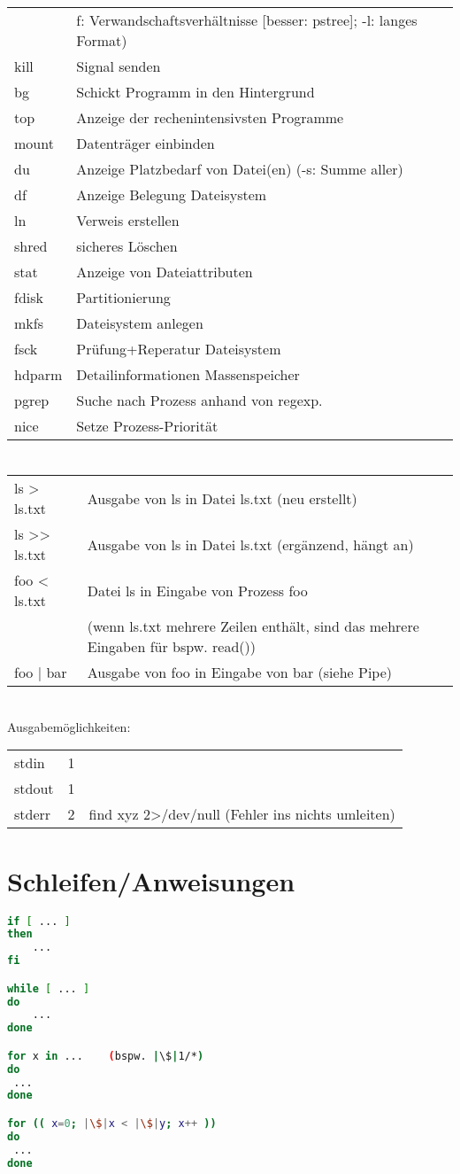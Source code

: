 \begin{longtable}[l]{ l | l }
& f: Verwandschaftsverhältnisse [besser: pstree]; -l: langes Format)\\
kill & Signal senden\\
bg & Schickt Programm in den Hintergrund\\
top & Anzeige der rechenintensivsten Programme\\
mount & Datenträger einbinden\\
du & Anzeige Platzbedarf von Datei(en) (-s: Summe aller)\\
df & Anzeige Belegung Dateisystem\\
ln & Verweis erstellen\\
shred & sicheres Löschen\\
stat & Anzeige von Dateiattributen\\
fdisk & Partitionierung\\
mkfs & Dateisystem anlegen\\
fsck & Prüfung+Reperatur Dateisystem\\
hdparm & Detailinformationen Massenspeicher\\
pgrep & Suche nach Prozess anhand von regexp.\\
nice & Setze Prozess-Priorität
\end{longtable}

\section[Weiterleitung]{}
\begin{tabular}{l l}
ls > ls.txt & Ausgabe von ls in Datei ls.txt (neu erstellt)\\
ls >> ls.txt & Ausgabe von ls in Datei ls.txt (ergänzend, hängt an)\\
foo < ls.txt & Datei ls in Eingabe von Prozess foo\\
& (wenn ls.txt mehrere Zeilen enthält, sind das mehrere Eingaben für bspw. read())\\
foo | bar & Ausgabe von foo in Eingabe von bar (siehe Pipe)
\end{tabular}\\
Ausgabemöglichkeiten:\\
\begin{tabular}{l l l}
stdin & 1 &\\
stdout & 1 &\\
stderr & 2 & find xyz 2>/dev/null (Fehler ins nichts umleiten) 
\end{tabular}

\section{Schleifen/Anweisungen}
\begin{lstlisting}[language=bash]
if [ ... ] 
then 
	... 
fi

while [ ... ] 
do 
	... 
done

for x in ...	(bspw. |\$|1/*)
do 
 ...
done

for (( x=0; |\$|x < |\$|y; x++ ))
do
 ...
done
\end{lstlisting}
